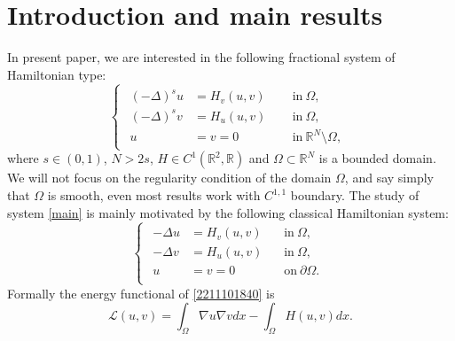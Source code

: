 \documentclass[10pt]{article}
\numberwithin{equation}{section}
\numberwithin{equation}{section}
\begin{document}
\section{Introduction and main results}
In present paper, we are interested in the following fractional system of Hamiltonian type:
\begin{equation}\label{main}
\begin{cases}
\begin{aligned}
(-\Delta)^{s} u&=H_v(u,v) \;\;&&\text{in}~\Omega,\\
(-\Delta)^{s} v&=H_u(u,v) &&\text{in}~\Omega,\\
u &= v = 0 &&\text{in} ~ \mathbb{R}^N\setminus\Omega,
\end{aligned}
\end{cases}
\end{equation}
where $s\in (0,1)$, $N>2s$, $H \in C^1(\mathbb{R}^2, \mathbb{R})$ and $\Omega \subset \mathbb{R}^N$ is a bounded domain. We will not focus on the regularity condition of the domain $\Omega$, and say simply that $\Omega$ is smooth, even most results work with $C^{1, 1}$ boundary.
The study of system \eqref{main} is mainly motivated by the following classical Hamiltonian system:
\begin{equation}\label{2211101840}
\begin{cases}
\begin{aligned}
-\Delta u&=H_v(u,v) \,&&\text{in}~\Omega,\\
-\Delta v&=H_u(u,v) &&\text{in}~\Omega,\\
u &= v = 0 &&\text{on} ~ \partial\Omega.\\
\end{aligned}
\end{cases}
\end{equation}
Formally the energy functional of \eqref{2211101840} is
\begin{equation}\label{2402041528}
\mathcal{L}(u, v)=\int_{\Omega}\nabla u \nabla v dx-\int_{\Omega}H(u, v) dx.
\end{equation}
\end{document}
